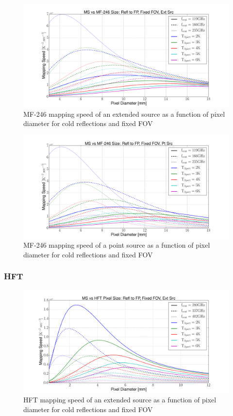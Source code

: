 \documentclass[12pt, titlepage]{article} %
\begin{document}
\begin{figure}[H]
	\centering
	\includegraphics[width=1.1\textwidth, center]{PDF/LFT_MS_MF-246_coldRefl_fixFOV_extSrc.pdf}
	\caption{MF-246 mapping speed of an extended source as a function of pixel diameter for cold reflections and fixed FOV}
\end{figure}

\begin{figure}[H]
	\centering
	\includegraphics[width=1.1\textwidth, center]{PDF/LFT_MS_MF-246_coldRefl_fixFOV_ptSrc.pdf}
	\caption{MF-246 mapping speed of a point source as a function of pixel diameter for cold reflections and fixed FOV}
\end{figure}


\subsubsection{HFT}

\begin{figure}[H]
	\centering
	\includegraphics[width=1.1\textwidth, center]{PDF/HFT_MS_coldRefl_fixFOV_extSrc.pdf}
	\caption{HFT mapping speed of an extended source as a function of pixel diameter for cold reflections and fixed FOV}
\end{figure}
\end{document}
